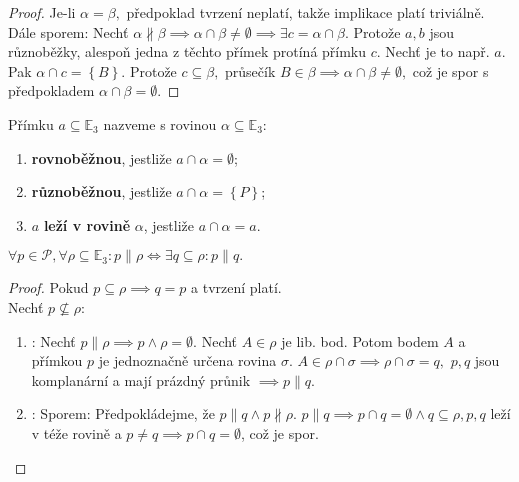 \begin{proof}
    Je-li $\alpha = \beta,$ předpoklad tvrzení neplatí, takže implikace platí
    triviálně. \\
    Dále sporem: Nechť $\alpha \nparallel \beta \implies \alpha \cap \beta \ne
    \emptyset \implies \exists c = \alpha \cap \beta.$ Protože $a,b$ jsou různoběžky,
    alespoň jedna z těchto přímek protíná přímku $c.$ Nechť je to např. $a.$ Pak
    $\alpha \cap c = \left \{ B \right \} .$ Protože $c\subseteq \beta,$ průsečík
    $B\in \beta \implies \alpha \cap \beta \ne \emptyset,$ což je spor s předpokladem
    $\alpha \cap \beta = \emptyset.$
\end{proof}

\begin{definition}
    Přímku $a \subseteq \mathbb E_3$ nazveme s rovinou $\alpha \subseteq \mathbb E_3:$
    \begin{enumerate}[$i.$]
        \item \textbf{rovnoběžnou}, jestliže $a\cap \alpha = \emptyset$;
        \item \textbf{různoběžnou}, jestliže $a\cap \alpha = \left \{ P \right \} $;
        \item $a$ \textbf{leží v rovině} $\alpha$, jestliže $a \cap \alpha = a$.
    \end{enumerate}
\end{definition}

\begin{veta}
    $\forall p \in \mathscr P, \forall \rho \subseteq \mathbb E_3: p \parallel \rho
    \iff \exists q\subseteq \rho: p\parallel q.$
\end{veta}

\begin{proof}
    Pokud $p \subseteq \rho \implies q=p$ a tvrzení platí.\\
    Nechť $p\not \subseteq \rho:$
    \begin{enumerate}[$i.$]
        \item \uv{$\implies$}: Nechť $p\parallel\rho\implies p\land \rho=\emptyset.$
        Nechť $A\in\rho$ je lib. bod. Potom bodem $A$ a přímkou $p$ je jednoznačně
        určena rovina $\sigma.$ $A\in \rho\cap\sigma \implies \rho\cap\sigma=q,$
        $p,q$ jsou komplanární a mají prázdný průnik $\implies p\parallel q.$
        \item \uv{$\impliedby$}: Sporem: Předpokládejme, že $p\parallel q \land
        p\nparallel \rho.$ $p\parallel q \implies p\cap q=\emptyset\land q\subseteq \rho,
        p,q$ leží v téže rovině a $p\ne q\implies p\cap q = \emptyset$, což je spor.
    \end{enumerate}
\end{proof}



